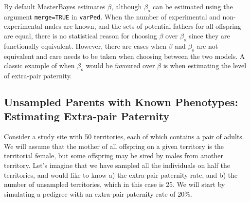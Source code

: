 \documentclass{article}
\begin{document}
By default MasterBayes estimates $\beta$, although $\beta_{o}$ can be estimated using the argument \texttt{merge=TRUE} in \texttt{varPed}.  When the number of experimental and non-experimental males are known, and the sets of potential fathers for all offspring are equal, there is no statistical reason for choosing $\beta$ over $\beta_{o}$ since they are functionally equivalent.  However, there are cases when $\beta$ and $\beta_{o}$ are not equivalent and care needs to be taken when choosing between the two models.  A classic example of when  $\beta_{o}$ would be favoured over $\beta$ is when estimating the level of extra-pair paternity.
 


\subsection{Unsampled Parents with Known Phenotypes: Estimating Extra-pair Paternity}
\label{EPP-sec}

Consider a study site with 50 territories, each of which contains a pair of adults.  We will assume that the mother of all offspring on a given territory is the territorial female, but some offspring may be sired by males from another territory.  Let's imagine that we have sampled all the individuals on half the territories, and would like to know a) the extra-pair paternity rate, and b) the number of unsampled territories, which in this case is 25. We will start by simulating a pedigree with an extra-pair paternity rate of 20\%.

\begin{Schunk}
\end{Schunk}
\end{document}
